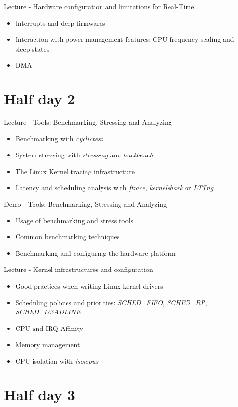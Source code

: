 \documentclass[a4paper,12pt,obeyspaces,spaces,hyphens]{article}
\begin{document}
\feagendaonecolumn
{Lecture - Hardware configuration and limitations for Real-Time}
{
  \begin{itemize}
  \item Interrupts and deep firmwares
  \item Interaction with power management features: CPU frequency
    scaling and sleep states
  \item DMA
  \end{itemize}
}

\section{Half day 2}

\feagendatwocolumn
{Lecture - Tools: Benchmarking, Stressing and Analyzing}
{
  \begin{itemize}
  \item Benchmarking with {\em cyclictest}
  \item System stressing with {\em stress-ng} and {\em hackbench}
  \item The Linux Kernel tracing infrastructure
  \item Latency and scheduling analysis with {\em ftrace}, {\em
      kernelshark} or {\em LTTng}
  \end{itemize}
}
{Demo - Tools: Benchmarking, Stressing and Analyzing}
{
  \begin{itemize}
  \item Usage of benchmarking and stress tools
  \item Common benchmarking techniques
  \item Benchmarking and configuring the hardware platform
  \end{itemize}
}

\feagendaonecolumn
{Lecture - Kernel infrastructures and configuration}
{
  \begin{itemize}
  \item Good practices when writing Linux kernel drivers
  \item Scheduling policies and priorities: {\em SCHED\_FIFO}, {\em
      SCHED\_RR}, {\em SCHED\_DEADLINE}
  \item CPU and IRQ Affinity
  \item Memory management
  \item CPU isolation with {\em isolcpus}
  \end{itemize}
}

\section{Half day 3}
\end{document}
